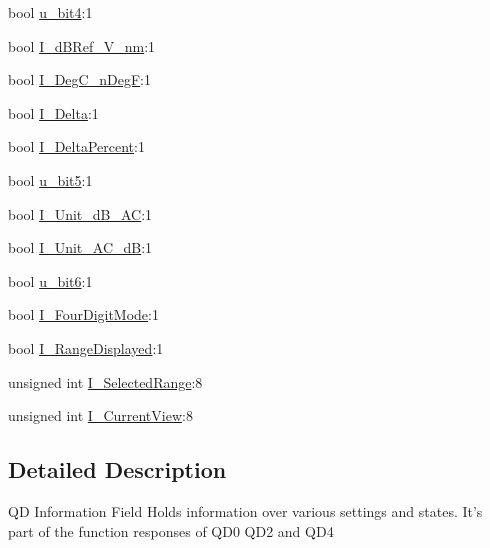 \begin{DoxyCompactItemize}
\item 
bool \hyperlink{structFluke_1_1Fluke189_1_1qdInfo__t_a012174b29b7e6686a724204f63a09c91}{u\_\-bit4}:1
\item 
bool \hyperlink{structFluke_1_1Fluke189_1_1qdInfo__t_a0f76472a62f21d1c44f0415064399213}{I\_\-dBRef\_\-V\_\-nm}:1
\item 
bool \hyperlink{structFluke_1_1Fluke189_1_1qdInfo__t_ad91077e4cb12c59aa769cfe825917f41}{I\_\-DegC\_\-nDegF}:1
\item 
bool \hyperlink{structFluke_1_1Fluke189_1_1qdInfo__t_ab4842e9293e5835bab8af588ba17a55c}{I\_\-Delta}:1
\item 
bool \hyperlink{structFluke_1_1Fluke189_1_1qdInfo__t_a44210af5a4c0b632b88b551e6a92846d}{I\_\-DeltaPercent}:1
\item 
bool \hyperlink{structFluke_1_1Fluke189_1_1qdInfo__t_ad123acd44f39185d0903250085834b72}{u\_\-bit5}:1
\item 
bool \hyperlink{structFluke_1_1Fluke189_1_1qdInfo__t_aec06148ae228f11298bf487bcabc630c}{I\_\-Unit\_\-dB\_\-AC}:1
\item 
bool \hyperlink{structFluke_1_1Fluke189_1_1qdInfo__t_aad69b17c3c85587c57221321aa94d6c5}{I\_\-Unit\_\-AC\_\-dB}:1
\item 
bool \hyperlink{structFluke_1_1Fluke189_1_1qdInfo__t_a3a48f6b82d6abd8613a7f7f091c7ad16}{u\_\-bit6}:1
\item 
bool \hyperlink{structFluke_1_1Fluke189_1_1qdInfo__t_ac27c02c4519f23bbe71f6c0f27253dec}{I\_\-FourDigitMode}:1
\item 
bool \hyperlink{structFluke_1_1Fluke189_1_1qdInfo__t_a3655a4961481c568f66253ed879f0b8c}{I\_\-RangeDisplayed}:1
\item 
unsigned int \hyperlink{structFluke_1_1Fluke189_1_1qdInfo__t_a6b4b393c0d2a331ec2f029447cebb917}{I\_\-SelectedRange}:8
\item 
unsigned int \hyperlink{structFluke_1_1Fluke189_1_1qdInfo__t_a6e80fb52d719bdf696fe23628ece9fdb}{I\_\-CurrentView}:8
\end{DoxyCompactItemize}


\subsection{Detailed Description}
QD Information Field Holds information over various settings and states. It's part of the function responses of QD0 QD2 and QD4 

